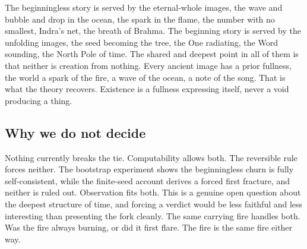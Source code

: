 The beginningless story is served by the eternal-whole images, the wave and bubble and drop in the ocean, the
spark in the flame, the number with no smallest, Indra's net, the breath of Brahma. The beginning story is served
by the unfolding images, the seed becoming the tree, the One radiating, the Word sounding, the North Pole of time.
The shared and deepest point in all of them is that neither is creation from nothing. Every ancient image has a
prior fullness, the world a spark of the fire, a wave of the ocean, a note of the song. That is what the theory
recovers. Existence is a fullness expressing itself, never a void producing a thing.

\subsection{Why we do not decide}

Nothing currently breaks the tie. Computability allows both. The reversible rule forces neither. The bootstrap
experiment shows the beginningless churn is fully self-consistent, while the finite-seed account derives a forced
first fracture, and neither is ruled out. Observation fits both. This is a genuine open question about the deepest
structure of time, and forcing a verdict would be less faithful and less interesting than presenting the fork
cleanly. The same carrying fire handles both. Was the fire always burning, or did it first flare. The fire is the
same fire either way.
